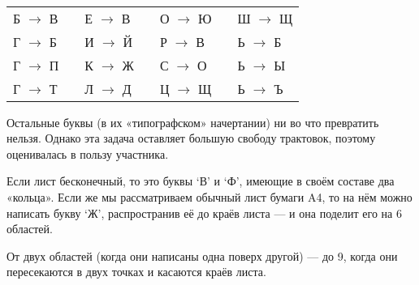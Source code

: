 \begin{itemize}

\def\ltr#1{`#1'}

\itA \ 

\begin{center}\begin{tabular}{lllllll}
	Б $\longrightarrow$ В & \quad & Е $\longrightarrow$ В & & О $\longrightarrow$ Ю & & Ш $\longrightarrow$ Щ \\
	Г $\longrightarrow$ Б & & И $\longrightarrow$ Й & \quad & Р $\longrightarrow$ В & & Ь $\longrightarrow$ Б \\
	Г $\longrightarrow$ П & & К $\longrightarrow$ Ж & & С $\longrightarrow$ О & \quad & Ь $\longrightarrow$ Ы \\
	Г $\longrightarrow$ Т & & Л $\longrightarrow$ Д & & Ц $\longrightarrow$ Щ & & Ь $\longrightarrow$ Ъ
\end{tabular}\end{center}

Остальные буквы (в их «типографском» начертании) ни во что превратить нельзя. Однако эта задача оставляет большую свободу трактовок, поэтому оценивалась в пользу участника.

\itB Если лист бесконечный, то это буквы \ltr В и \ltr Ф, имеющие в своём составе два «кольца». Если же мы рассматриваем обычный лист бумаги A4, то на нём можно написать букву \ltr Ж, распространив её до краёв листа — и она поделит его на 6 областей.

\itC От двух областей (когда они написаны одна поверх другой) — до 9, когда они пересекаются в двух точках и касаются краёв листа.
\end{itemize}